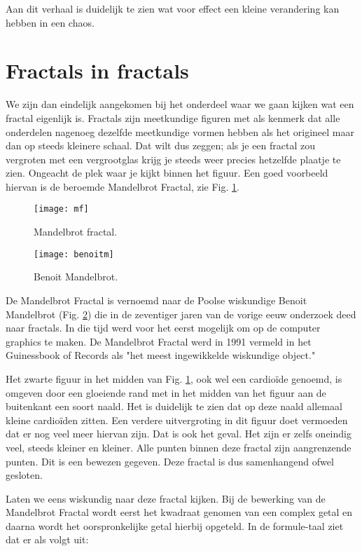 \documentclass[11pt,fleqn]{book} %
\begin{document}
Aan dit verhaal is duidelijk te zien wat voor effect een kleine verandering kan hebben in een chaos.

\section{Fractals in fractals}
We zijn dan eindelijk aangekomen bij het onderdeel waar we gaan kijken wat een fractal eigenlijk is.
Fractals zijn meetkundige figuren met als kenmerk dat alle onderdelen nagenoeg dezelfde meetkundige vormen hebben als het origineel maar dan op steeds kleinere schaal. Dat wilt dus zeggen; als je een fractal zou vergroten met een vergrootglas krijg je steeds weer precies hetzelfde plaatje te zien. Ongeacht de plek waar je kijkt binnen het figuur. Een goed voorbeeld hiervan is de beroemde Mandelbrot Fractal, zie Fig. \ref{fig:mf}.
\begin{figure}[h]
	\centering\texttt{[image: mf]}
	\caption{Mandelbrot fractal.}
	\label{fig:mf}
\end{figure}
\begin{figure}[h]
	\centering\texttt{[image: benoitm]}
	\caption{Benoit Mandelbrot.}
	\label{fig:benoitm}
\end{figure}
De Mandelbrot Fractal is vernoemd naar de Poolse wiskundige Benoit Mandelbrot (Fig. \ref{fig:benoitm}) die in de zeventiger jaren van de vorige eeuw onderzoek deed naar fractals. In die tijd werd voor het eerst mogelijk om op de computer graphics te maken. De Mandelbrot Fractal werd in 1991 vermeld in het Guinessbook of Records als "het meest ingewikkelde wiskundige object."

Het zwarte figuur in het midden van Fig. \ref{fig:mf}, ook wel een cardioïde genoemd, is omgeven door een gloeiende rand met in het midden van het figuur aan de buitenkant een soort naald. Het is duidelijk te zien dat op deze naald allemaal kleine cardioïden zitten. Een verdere uitvergroting in dit figuur doet vermoeden dat er nog veel meer hiervan zijn. Dat is ook het geval. Het zijn er zelfs oneindig veel, steeds kleiner en kleiner. Alle punten binnen deze fractal zijn aangrenzende punten. Dit is een bewezen gegeven. Deze fractal is dus samenhangend ofwel gesloten.

Laten we eens wiskundig naar deze fractal kijken. Bij de bewerking van de Mandelbrot Fractal wordt eerst het kwadraat genomen van een complex getal en daarna wordt het oorspronkelijke getal hierbij opgeteld. In de formule-taal ziet dat er als volgt uit:
\end{document}
